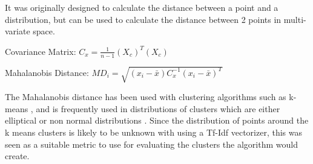 It was originally designed to calculate the distance between a point and a distribution, but can be used to calculate the distance between 2 points in multi-variate space. 

\begin{center}
	Covariance Matrix:
	$C_{x} = \frac{1}{n - 1} (X_{c}) ^T (X_{c})$
	
	Mahalanobis Distance:
	$MD_{i} = \sqrt{(x_{i}  -  \bar{ x  } ) C_{x}^{-1} ( x_{i}   - \bar{ x  }  )^T    }  $
\end{center}

The Mahalanobis distance has been used with clustering algorithms such as k-means \cite{melnykov2014k} \cite{cerioli2005k}, and is frequently used in distributions of clusters which are either elliptical \cite{mitchell1985mahalanobis} or non normal distributions \cite{warren2011use}. Since the distribution of points around the k means clusters is likely to be unknown with using a Tf-Idf vectorizer, this was seen as a suitable metric to use for evaluating the clusters the algorithm would create.